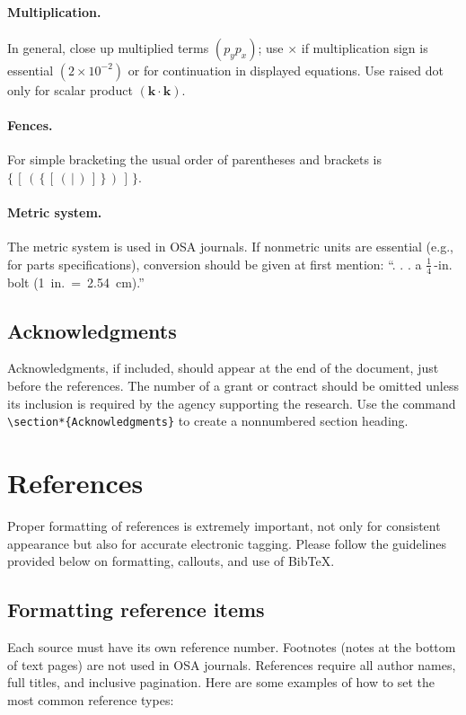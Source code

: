 \documentclass[10pt,letterpaper]{article}
\begin{document}
\paragraph*{\bf Multiplication.}
In general, close up multiplied terms $(p_yp_x)$;
use $\times$ if multiplication sign is essential $(2 \times
10^{-2})$ or for continuation in displayed equations. Use raised dot only for scalar product $(\mathbf{k \cdot k})$.

\paragraph*{\bf Fences.}
For simple bracketing the usual order of parentheses and brackets
is $\{ \, [  \, (  \,  \{  \, [  \, (  \, |  \, )  \, ]  \, \} \,
)  \, ]  \, \}$.


\paragraph*{\bf Metric system.}
The metric system is used in OSA journals. If nonmetric units are
essential (e.g., for parts specifications), conversion should be
given at first mention:  ``. . . a $\frac{1}{4}$\,-in. bolt \mbox{(1 in.
= 2.54 cm).''}

\subsection{Acknowledgments} Acknowledgments, if included, should
appear at the end of the document, just before the references. The
number of a grant or contract should be omitted unless its
inclusion is required by the agency supporting the research. Use
the command \verb+\section*{Acknowledgments}+  to create a
nonnumbered section heading.
\section{References}
\label{sec:refs}
Proper formatting of references is extremely important, not only for consistent appearance but also for accurate electronic tagging. Please follow the guidelines provided below on formatting, callouts, and use of Bib\TeX.

\subsection{Formatting reference items}
Each source must have its own reference number. Footnotes (notes
at the bottom of text pages) are not used in OSA journals.
References require all author names, full titles, and inclusive
pagination. Here are some examples of how to set the most common
reference types:
\end{document}
